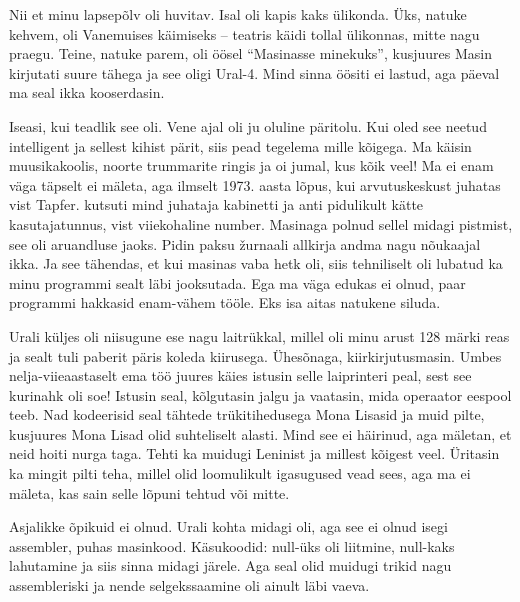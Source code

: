Nii et minu lapsepõlv oli huvitav. Isal oli kapis kaks ülikonda. 
Üks, natuke kehvem, oli Vanemuises käimiseks -- teatris käidi tollal ülikonnas, 
mitte nagu praegu. Teine, natuke parem, oli öösel \enquote{Masinasse 
minekuks}, kusjuures Masin kirjutati suure tähega ja see oligi 
Ural-4. Mind sinna öösiti ei lastud, aga päeval ma seal 
ikka kooserdasin. 


Iseasi, kui teadlik see oli. Vene ajal oli ju oluline 
päritolu. Kui oled see neetud intelligent ja sellest kihist pärit, 
siis pead tegelema mille kõigega. Ma käisin muusikakoolis, noorte trummarite 
ringis ja oi jumal, kus kõik veel! Ma ei enam väga täpselt ei mäleta, aga 
ilmselt 1973. aasta lõpus, kui arvutuskeskust juhatas vist Tapfer. kutsuti mind juhataja kabinetti ja anti pidulikult kätte kasutajatunnus, vist
viiekohaline number. Masinaga polnud sellel midagi pistmist, 
see oli aruandluse jaoks. Pidin paksu žurnaali allkirja 
andma nagu nõukaajal ikka. Ja see tähendas, et kui masinas 
vaba hetk oli, siis tehniliselt oli lubatud ka minu programmi sealt läbi 
jooksutada. Ega ma väga edukas ei olnud, paar programmi hakkasid
enam-vähem tööle. Eks isa aitas natukene siluda.

Urali küljes oli niisugune 
ese nagu laitrükkal, millel oli minu arust 128 märki reas 
ja sealt tuli paberit päris koleda kiirusega. Ühesõnaga, kiirkirjutusmasin. Umbes nelja-viieaastaselt ema töö
juures käies istusin selle laiprinteri peal, sest see kurinahk oli soe! 
Istusin seal, kõlgutasin jalgu ja vaatasin, mida operaator 
eespool teeb. Nad kodeerisid seal tähtede 
trükitihedusega Mona Lisasid ja muid pilte, kusjuures Mona Lisad 
olid suhteliselt alasti. Mind see ei häirinud, aga mäletan, et
neid hoiti nurga taga. Tehti ka muidugi Leninist ja millest kõigest veel. Üritasin 
ka mingit pilti teha, millel olid loomulikult igasugused vead sees, aga ma ei 
mäleta, kas sain selle lõpuni tehtud või mitte. 


Asjalikke õpikuid ei olnud. Urali kohta midagi oli, aga 
see ei olnud isegi assembler, puhas masinkood. Käsukoodid: 
null-üks oli liitmine, null-kaks lahutamine ja siis 
sinna midagi järele. Aga seal olid muidugi trikid nagu assembleriski ja nende 
selgekssaamine oli ainult läbi vaeva. 

